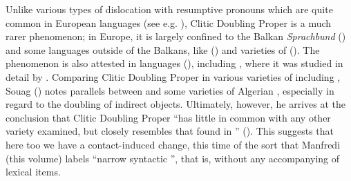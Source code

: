 \documentclass[output=paper]{langsci/langscibook}
\begin{document}
Unlike various types of dislocation with resumptive  pronouns which are quite common in European languages (see e.g. \citealt{Decat2010}), Clitic Doubling Proper is a much rarer phenomenon; in Europe, it is largely confined to the Balkan \textit{Sprachbund} (\citealt{Friedman2008}) and some  languages outside of the Balkans, like  (\citealt[7]{Zagona2002}) and varieties of  (\citealt[231--233]{Russi2008}). The phenomenon is also attested in  languages (\citealt{Khan1984}), including , where it was studied in detail by \cite{Souag2017clitic}. Comparing Clitic Doubling Proper in various varieties of  including , Souag (\citeyear[57]{Souag2017clitic}) notes parallels between  and some varieties of Algerian , especially in regard to the doubling of indirect objects. Ultimately, however, he arrives at the conclusion that  Clitic Doubling Proper ``has little in common with any other  variety examined, but closely resembles that found in '' (\citealt[60]{Souag2017clitic}). This suggests that here too we have a contact-induced change, this time of the sort that Manfredi (this volume) labels ``narrow syntactic '', that is, without any accompanying  of lexical items.
\end{document}
